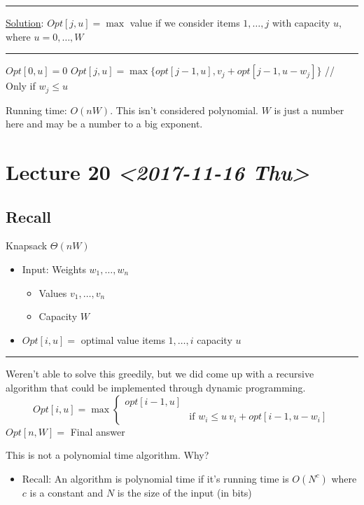 \documentclass[11pt]{article}
\begin{document}
\noindent\rule{\textwidth}{0.5pt}
\uline{Solution}:
\(Opt[j,u]=\max\) value if we consider items \(1,\ldots,j\) with capacity \(u\), where \(u=0, \ldots, W\)

\noindent\rule{\textwidth}{0.5pt}
\begin{algorithmic}
	\State $Opt[0,u]=0$
\EndFor
{}
	   \State $Opt[j,u] = \max \{opt[j-1,u], v_j+opt[j-1,u-w_j]\}$
	   \State // Only if $w_j \leq u$
\EndFor
\end{algorithmic}
Running time: \(O(nW)\). This isn't considered polynomial. \(W\) is just a number here and may be a number to a big exponent.
\section{Lecture 20 \textit{<2017-11-16 Thu>}}
\label{sec:orga2fb97a}
\subsection{Recall}
\label{sec:org0a2d1f1}
Knapsack \(\Theta(nW)\)
\begin{itemize}
\item Input: Weights \(w_1,\ldots,w_n\)
\begin{itemize}
\item Values \(v_1,\ldots,v_n\)
\item Capacity \(W\)
\end{itemize}
\item \(Opt[i,u]=\) optimal value items \(1,\ldots,i\) capacity \(u\)
\end{itemize}

\noindent\rule{\textwidth}{0.5pt}
Weren't able to solve this greedily, but we did come up with a recursive algorithm that could be implemented through dynamic programming.
\begin{equation*}
Opt[i,u] = \max 
\begin{cases}
opt[i-1, u]
\\ & \text{if } w_i\leq u \ v_i + opt[i-1, u-w_i]
\end{cases}
\end{equation*}
\(Opt[n,W]=\) Final answer

This is not a polynomial time algorithm. Why?
\begin{itemize}
\item Recall: An algorithm is polynomial time if it's running time is \(O(N^c)\) where \(c\) is a constant and \(N\) is the size of the input (in bits)
\end{itemize}
\end{document}
